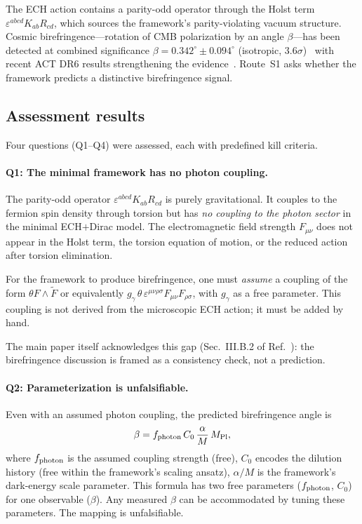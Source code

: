 \documentclass[11pt,letterpaper]{article}
\newcommand{\MPl}{M_{\rm Pl}}
\begin{document}
The ECH action contains a parity-odd operator through the Holst term
$\varepsilon^{abcd}K_{ab}R_{cd}$, which sources the framework's
parity-violating vacuum structure. Cosmic birefringence---rotation of CMB
polarization by an angle $\beta$---has been detected at combined
significance $\beta = 0.342^\circ \pm 0.094^\circ$ (isotropic,
$3.6\sigma$)~\cite{EskiltKomatsu2022} with recent ACT DR6 results
strengthening the evidence~\cite{DiegoPalazuelos2025}. Route~S1 asks
whether the framework predicts a distinctive birefringence signal.

\subsection{Assessment results}\label{sec:S1_results}

Four questions (Q1--Q4) were assessed, each with predefined kill criteria.

\paragraph{Q1: The minimal framework has no photon coupling.}
The parity-odd operator $\varepsilon^{abcd}K_{ab}R_{cd}$ is purely
gravitational. It couples to the fermion spin density through torsion but
has \emph{no coupling to the photon sector} in the minimal ECH$+$Dirac
model. The electromagnetic field strength $F_{\mu\nu}$ does not appear in
the Holst term, the torsion equation of motion, or the reduced action
after torsion elimination.

For the framework to produce birefringence, one must \emph{assume} a
coupling of the form $\theta F\wedge\tilde{F}$ or equivalently
$g_{\gamma}\,\theta\,\varepsilon^{\mu\nu\rho\sigma}F_{\mu\nu}F_{\rho\sigma}$,
with $g_\gamma$ as a free parameter. This coupling is not derived from the
microscopic ECH action; it must be added by hand.

The main paper itself acknowledges this gap (Sec.~III.B.2 of
Ref.~\cite{Golden2026}): the birefringence discussion is framed as a
consistency check, not a prediction.

\paragraph{Q2: Parameterization is unfalsifiable.}
Even with an assumed photon coupling, the predicted birefringence angle is
\begin{equation}\label{eq:beta}
  \beta = f_{\rm photon}\,C_0\,\frac{\alpha}{M}\,\MPl,
\end{equation}
where $f_{\rm photon}$ is the assumed coupling strength (free),
$C_0$ encodes the dilution history (free within the framework's scaling
ansatz), $\alpha/M$ is the framework's dark-energy scale parameter. This
formula has two free parameters ($f_{\rm photon}$, $C_0$) for one
observable ($\beta$). Any measured $\beta$ can be accommodated by tuning
these parameters. The mapping is unfalsifiable.
\end{document}
